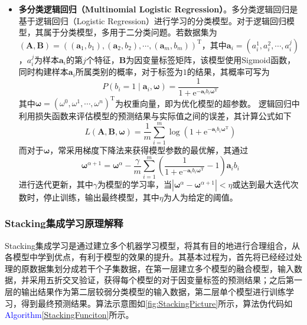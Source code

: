 \documentclass{MathorCupmodeling}
\begin{document}
\begin{itemize}
		\item \textbf{多分类逻辑回归（Multinomial Logistic Regression）}。多分类逻辑回归是基于逻辑回归（Logistic Regression）进行学习的分类模型。对于逻辑回归模型，其属于分类模型，多用于二分类问题。若数据集为$\left(\boldsymbol{A},\boldsymbol{B}\right)=\left(\left(\boldsymbol{a}_1,b_1\right),\left(\boldsymbol{a}_2,b_2\right),\cdots,\left(\boldsymbol{a}_m,b_m\right)\right)^{\mathrm{T}}$，其中$\boldsymbol{a}_i=\left(a_i^1,a_i^2,\cdots,a_i^j\right)$，$a_i^j$为样本$\boldsymbol{a}_i$的第$j$个特征，$\boldsymbol{B}$为因变量标签矩阵，该模型使用Sigmoid函数，同时构建样本$\boldsymbol{a}_i$所属类别的概率，对于标签为$1$的结果，其概率可写为
		\begin{equation}
			P\left(b_i=1\mid \boldsymbol{a}_i,\boldsymbol{\omega}\right)=\frac{1}{1+\mathrm{e}^{-\boldsymbol{a}_ib_i\boldsymbol{\omega}^\mathrm{T}}} \label{fLRp}
		\end{equation}
		其中$\boldsymbol{\omega}=\left(\omega^0,\omega^1,\cdots,\omega^n\right)^\mathrm{T}$为权重向量，即为优化模型的超参数。
		逻辑回归中利用损失函数来评估模型的预测结果与实际值之间的误差，其计算公式如下
		\begin{equation}
			L\left(\boldsymbol{A},\boldsymbol{B},\boldsymbol{\omega}\right)=\frac{1}{m}\sum\limits_{i=1}^{m}\log \left(1+\mathrm{e}^{-\boldsymbol{a}_ib_i \boldsymbol{\omega}^{\mathrm{T}}}\right) \label{fLRl}
		\end{equation}
		而对于$\boldsymbol{\omega}$，常采用梯度下降法来获得模型参数的最优解，其通过
		\begin{equation}
			\boldsymbol{\omega}^{\alpha+1}=\boldsymbol{\omega}^\alpha-\frac{\gamma}{m}\sum\limits_{i=1}^{m}\left(\frac{1}{1+\mathrm{e}^{-\boldsymbol{a}_ib_i \boldsymbol{\omega}^{\mathrm{T}}}}-1\right)\boldsymbol{a}_ib_i \label{fLRw}
		\end{equation}
		进行迭代更新，其中$\gamma$为模型的学习率，当$\left|  \boldsymbol{\omega}^{\alpha}-\boldsymbol{\omega}^{\alpha+1} \right|<\eta$或达到最大迭代次数时，停止训练，输出最终模型，其中$\eta$为人为给定的阈值\textcolor{blue}{\cite{plr}}。
	\end{itemize}
	
	\subsubsection{Stacking集成学习原理解释}
	Stacking集成学习是通过建立多个机器学习模型，将其有目的地进行合理组合，从各模型中学到优点，有利于模型的效果的提升。其基本过程为，首先将已经经过处理的原数据集划分成若干个子集数据，在第一层建立多个模型的融合模型，输入数据，并采用五折交叉验证，获得每个模型的对于因变量标签的预测结果；之后第一层的输出结果作为第二层较弱分类模型的输入数据，第二层单个模型进行训练学习，得到最终预测结果\textcolor{blue}{\cite{pstacking}}。算法示意图如\textcolor{blue}{\cref{fig:StackingPicture}}所示，算法伪代码如\textcolor{blue}{Algorithm\ref{StackingFunciton}}所示。
\end{document}
